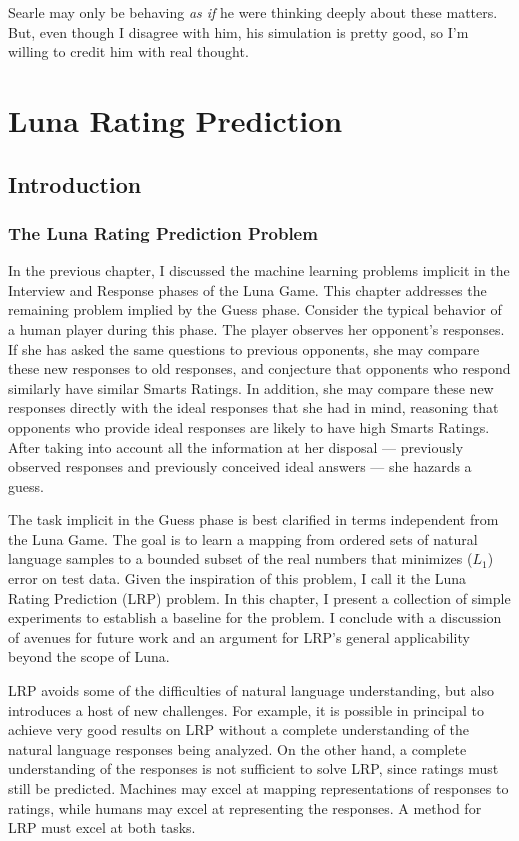 \begin{savequote}[75mm]
Searle may only be behaving \textit{as if} he were thinking deeply about these matters. But, even though I disagree with him, his simulation is pretty good, so I'm willing to credit him with real thought.
\end{savequote}

\chapter{Luna Rating Prediction}

\section{Introduction}
\subsection{The Luna Rating Prediction Problem}
In the previous chapter, I discussed the machine learning problems implicit in the Interview and Response phases of the Luna Game. This chapter addresses the remaining problem implied by the Guess phase. Consider the typical behavior of a human player during this phase. The player observes her opponent's responses. If she has asked the same questions to previous opponents, she may compare these new responses to old responses, and conjecture that opponents who respond similarly have similar Smarts Ratings. In addition, she may compare these new responses directly with the ideal responses that she had in mind, reasoning that opponents who provide ideal responses are likely to have high Smarts Ratings. After taking into account all the information at her disposal --- previously observed responses and previously conceived ideal answers --- she hazards a guess.

The task implicit in the Guess phase is best clarified in terms independent from the Luna Game. The goal is to learn a mapping from ordered sets of natural language samples to a bounded subset of the real numbers that minimizes ($L_1$) error on test data. Given the inspiration of this problem, I call it the Luna Rating Prediction (LRP) problem. In this chapter, I present a collection of simple experiments to establish a baseline for the problem. I conclude with a discussion of avenues for future work and an argument for LRP's general applicability beyond the scope of Luna.

LRP avoids some of the difficulties of natural language understanding, but also introduces a host of new challenges. For example, it is possible in principal to achieve very good results on LRP without a complete understanding of the natural language responses being analyzed. On the other hand, a complete understanding of the responses is not sufficient to solve LRP, since ratings must still be predicted. Machines may excel at mapping representations of responses to ratings, while humans may excel at representing the responses. A method for LRP must excel at both tasks.

